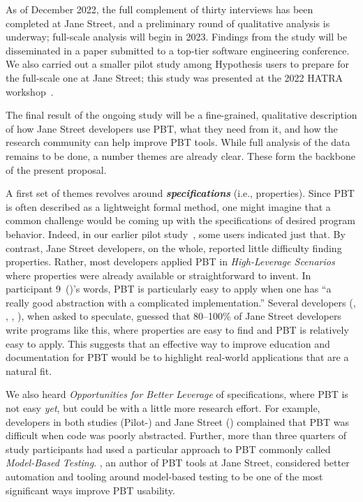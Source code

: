 As of December 2022, the full complement of thirty interviews has been
completed at Jane Street, and a preliminary round of qualitative
analysis is underway; full-scale analysis will begin in 2023.
Findings from the study will be disseminated in a paper submitted to a
top-tier software engineering conference.  We also carried out a
smaller pilot study among Hypothesis users to prepare for the
full-scale one at Jane Street; this study was presented at the
2022 HATRA workshop~\cite{goldstein_problems_2022}.

 The final result of
the ongoing study will be a fine-grained, qualitative description of how
Jane Street developers use PBT, what they need from it, and how the
research community can
help improve PBT tools. While full analysis of the data remains
to be done, a number themes are already clear. These form the backbone
of the present proposal.

\newcommand{\proptheme}[1]{{\color{nord-orange} \em #1}}
\newcommand{\gentheme}[1]{{\color{nord-green} \em #1}}
\newcommand{\evaltheme}[1]{{\color{nord-purple} \em #1}}
\newcommand{\edutheme}[1]{{\color{nord-frost4} \em #1}}
A first set of
themes revolves around \proptheme{\normalfont \bf specifications} (i.e.,
properties).
Since
PBT is often described as a lightweight formal method, one
might imagine that a common challenge would be coming up with the
specifications of desired program behavior. Indeed, in our earlier pilot
study~\cite{goldstein_problems_2022}, some users indicated just that.
By contrast, Jane Street developers, on the whole, reported
little difficulty finding
properties. Rather, most developers applied PBT in
\proptheme{High-Leverage Scenarios} where properties were already
available or straightforward to invent. In participant
9~()'s words, PBT is particularly easy to apply when one
has ``a really good abstraction with a complicated implementation.''
Several developers (, ,
, ), when asked to speculate, guessed
that 80--100\% of Jane Street
developers write programs like this, where properties are easy to find and
PBT is relatively easy to apply. This suggests that an effective way to
improve education and documentation for PBT would be to highlight
real-world applications that are a natural fit.

We also heard \proptheme{Opportunities for Better
Leverage} of specifications, where PBT is not easy {\em yet}, but
could be with a little more research effort. For example, developers in
both studies (Pilot-) and Jane Street () complained
that PBT was difficult when code was poorly abstracted.  Further,
more than three
quarters of study participants had used a particular approach to PBT commonly
called \proptheme{Model-Based Testing}.  , an author of PBT tools
at Jane Street, considered better automation and tooling around model-based
testing to be one of the most significant ways improve PBT usability.

